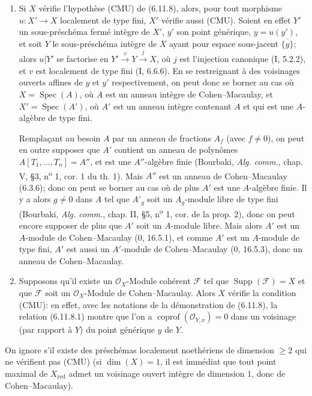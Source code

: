 \begin{remarks}[6.11.9]
\label{IV.2.s6.11.9-fr}
\begin{enumerate}
\item[(i)] Si $X$ vérifie l'hypothèse (CMU) de (6.11.8), alors, pour tout
morphisme $u:X'\to X$ localement de type fini, $X'$ vérifie aussi (CMU).
Soient en effet $Y'$ un sous-préschéma fermé intègre de $X'$, $y'$ son point
générique, $y=u(y')$, et soit $Y$ le sous-préschéma intègre de $X$ ayant
pour espace sous-jacent $\overline{\{y\}}$; alors $u|Y'$ se factorise en
$Y'\xrightarrow{v}Y\xrightarrow{j}X$, où $j$ est l'injection canonique
(I, 5.2.2), et $v$ est localement de type fini (I, 6.6.6). En se
restreignant à des voisinages ouverts affines de $y$ et $y'$ respectivement,
on peut donc se borner au cas où $X=\operatorname{Spec}(A)$, où $A$ est un
anneau intègre de Cohen--Macaulay, et $X'=\operatorname{Spec}(A')$, où $A'$
est un anneau intègre contenant $A$ et qui est une $A$-algèbre de type fini.


Remplaçant au besoin $A$ par un anneau de fractions $A_f$ (avec $f\ne0$),
on peut en outre supposer que $A'$ contient un anneau de polynômes
$A[T_1,\ldots,T_n]=A''$, et est une $A''$-algèbre finie (Bourbaki,
\emph{Alg. comm.}, chap. V, \S3, n\textsuperscript{o} 1, cor. 1 du th. 1).
Mais $A''$ est un anneau de Cohen--Macaulay (6.3.6); donc on peut se borner
au cas où de plus $A'$ est une $A$-algèbre finie. Il y a alors $g\ne0$ dans
$A$ tel que $A'_g$ soit un $A_g$-module libre de type fini (Bourbaki,
\emph{Alg. comm.}, chap. II, \S5, n\textsuperscript{o} 1, cor. de la
prop. 2), donc on peut encore supposer de plus que $A'$ soit un $A$-module
libre. Mais alors $A'$ est un $A$-module de Cohen--Macaulay (0, 16.5.1), et
comme $A'$ est un $A$-module de type fini, $A'$ est aussi un $A'$-module de
Cohen--Macaulay (0, 16.5.3), donc un anneau de Cohen--Macaulay.
\item[(ii)] Supposons qu'il existe un $\mathcal O_X$-Module cohérent
$\mathcal F$ tel que $\operatorname{Supp}(\mathcal F)=X$ et que
$\mathcal F$ soit un $\mathcal O_X$-Module de Cohen--Macaulay. Alors $X$
vérifie la condition (CMU): en effet, avec les notations de la démonstration
de (6.11.8), la relation (6.11.8.1) montre que l'on a
$\operatorname{coprof}(\mathcal O_{Y,x})=0$ dans un voisinage (par rapport
à $Y$) du point générique $y$ de $Y$.
\end{enumerate}

On ignore s'il existe des préschémas localement noethériens de dimension
$\geq2$ qui ne vérifient pas (CMU) (si $\dim(X)=1$, il est immédiat que tout
point maximal de $X_{\mathrm{red}}$ admet un voisinage ouvert intègre de
dimension $1$, donc de Cohen--Macaulay).
\end{remarks}

